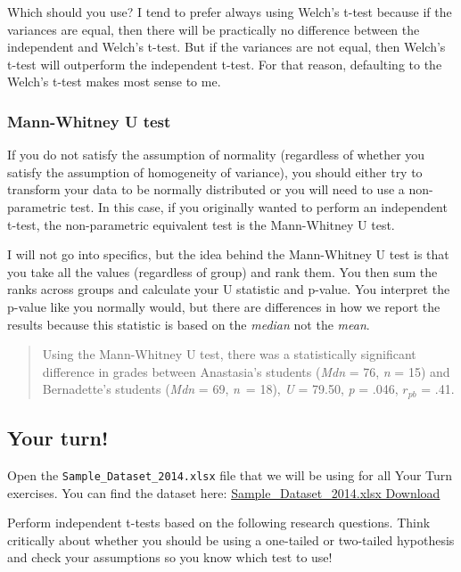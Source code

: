 \documentclass[
]{book}
\begin{document}
Which should you use? I tend to prefer always using Welch's t-test because if the variances are equal, then there will be practically no difference between the independent and Welch's t-test. But if the variances are not equal, then Welch's t-test will outperform the independent t-test. For that reason, defaulting to the Welch's t-test makes most sense to me.

\hypertarget{mann-whitney-u-test}{%
\subsubsection{Mann-Whitney U test}\label{mann-whitney-u-test}}

If you do not satisfy the assumption of normality (regardless of whether you satisfy the assumption of homogeneity of variance), you should either try to transform your data to be normally distributed or you will need to use a non-parametric test. In this case, if you originally wanted to perform an independent t-test, the non-parametric equivalent test is the Mann-Whitney U test.

I will not go into specifics, but the idea behind the Mann-Whitney U test is that you take all the values (regardless of group) and rank them. You then sum the ranks across groups and calculate your U statistic and p-value. You interpret the p-value like you normally would, but there are differences in how we report the results because this statistic is based on the \emph{median} not the \emph{mean}.

\begin{quote}
Using the Mann-Whitney U test, there was a statistically significant difference in grades between Anastasia's students (\emph{Mdn} = 76, \emph{n} = 15) and Bernadette's students (\emph{Mdn} = 69, \emph{n}~= 18), \emph{U} = 79.50, \emph{p} = .046, \(r_{pb}\) = .41.
\end{quote}

\hypertarget{your-turn-1}{%
\subsection{Your turn!}\label{your-turn-1}}

Open the \texttt{Sample\_Dataset\_2014.xlsx} file that we will be using for all Your Turn exercises. You can find the dataset here: \href{https://github.com/danawanzer/stats-with-jamovi/blob/master/data/Sample_Dataset_2014.xlsx}{Sample\_Dataset\_2014.xlsx Download}

Perform independent t-tests based on the following research questions. Think critically about whether you should be using a one-tailed or two-tailed hypothesis and check your assumptions so you know which test to use!
\end{document}
